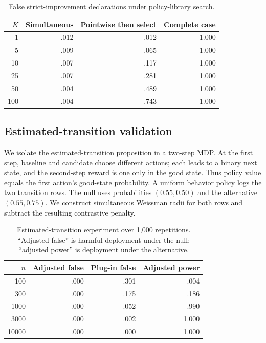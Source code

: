 \documentclass[letterpaper]{article}
\begin{document}
\begin{table}[t]
\centering
\small
\caption{False strict-improvement declarations under policy-library search.}
\label{tab:post}
\begin{tabular}{rrrr}
\toprule
$K$ & Simultaneous & Pointwise then select & Complete case \\
\midrule
1 & .012 & .012 & 1.000 \\
5 & .009 & .065 & 1.000 \\
10 & .007 & .117 & 1.000 \\
25 & .007 & .281 & 1.000 \\
50 & .004 & .489 & 1.000 \\
100 & .004 & .743 & 1.000 \\
\bottomrule
\end{tabular}
\end{table}

\subsection{Estimated-transition validation}
We isolate the estimated-transition proposition in a two-step MDP. At the first step, baseline and candidate choose different actions; each leads to a binary next state, and the second-step reward is one only in the good state. Thus policy value equals the first action's good-state probability. A uniform behavior policy logs the two transition rows. The null uses probabilities $(0.55,0.50)$ and the alternative $(0.55,0.75)$. We construct simultaneous Weissman radii for both rows and subtract the resulting contrastive penalty.

\begin{table}[t]
\centering
\small
\caption{Estimated-transition experiment over 1,000 repetitions. ``Adjusted false'' is harmful deployment under the null; ``adjusted power'' is deployment under the alternative.}
\label{tab:transition-supp}
\begin{tabular}{rrrr}
\toprule
$n$ & Adjusted false & Plug-in false & Adjusted power \\
\midrule
100   & .000 & .301 & .004 \\
300   & .000 & .175 & .186 \\
1000  & .000 & .052 & .990 \\
3000  & .000 & .002 & 1.000 \\
10000 & .000 & .000 & 1.000 \\
\bottomrule
\end{tabular}
\end{table}
\end{document}
